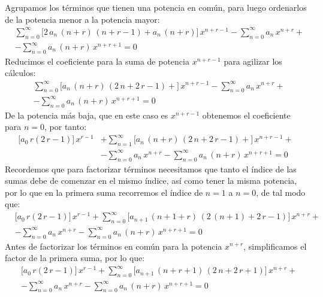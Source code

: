 Agrupamos los términos que tienen una potencia en común, para luego ordenarlos de la potencia menor a la potencia mayor:
\begin{align*}
&\sum_{n=0}^{\infty} \bigg[ 2 \, a_{n} \, (n + r) \, (n + r - 1) + a_{n} \, (n + r) \bigg] \, x^{n+r-1} -
\sum_{n=0}^{\infty} a_{n} \, x^{n+r} +  \\[0.5em]
&- \sum_{n=0}^{\infty} a_{n} \, (n + r) \, x^{n+r+1}  = 0
\end{align*}
Reducimos el coeficiente para la suma de potencia $x^{n+r-1}$ para agilizar los cálculos:
\begin{align*}
&\sum_{n=0}^{\infty} \bigg[ a_{n} \, (n + r) \, (2 \, n + 2 \, r - 1) + \bigg] \, x^{n+r-1} -
\sum_{n=0}^{\infty} a_{n} \, x^{n+r} +  \\[0.5em]
&- \sum_{n=0}^{\infty} a_{n} \, (n + r) \, x^{n+r+1}  = 0
\end{align*}
De la potencia más baja, que en este caso es $x^{n+r-1}$ obtenemos el coeficiente para $n=0$, por tanto:
\begin{align*}
\bigg[ a_{0} \, r (2 \, r - 1) \bigg] \, x^{r-1} &+ \sum_{n=1}^{\infty} \bigg[ a_{n} \, (n + r) \, (2 \, n + 2 \, r - 1) + \bigg] \, x^{n+r-1} + \\[0.5em]
&- \sum_{n=0}^{\infty} a_{n} \, x^{n+r} - \sum_{n=0}^{\infty} a_{n} \, (n + r) \, x^{n+r+1}  = 0
\end{align*}
Recordemos que para factorizar términos necesitamos que tanto el índice de las sumas debe de comenzar en el mismo índice, así como tener la misma potencia, por lo que en la primera suma recorremos el índice de $n = 1$ a $n = 0$, de tal modo que:
\begin{align*}
&\bigg[ a_{0} \, r (2 \, r - 1) \bigg] \, x^{r-1} + \sum_{n=0}^{\infty} \bigg[ a_{n+1} \, (n + 1 + r) \, (2 \, (n + 1) + 2 \, r - 1) \bigg] \, x^{n+r} + \\[0.5em]
&- \sum_{n=0}^{\infty} a_{n} \, x^{n+r} - \sum_{n=0}^{\infty} a_{n} \, (n + r) \, x^{n+r+1}  = 0
\end{align*}
Antes de factorizar los términos en común para la potencia $x^{n+r}$, simplificamos el factor de la primera suma, por lo que:
\begin{align*}
&\bigg[ a_{0} \, r (2 \, r - 1) \bigg] \, x^{r-1} + \sum_{n=0}^{\infty} \bigg[ a_{n+1} \, (n + r + 1) \, (2 \, n + 2 \, r + 1) \bigg] \, x^{n+r} + \\[0.5em]
&- \sum_{n=0}^{\infty} a_{n} \, x^{n+r} - \sum_{n=0}^{\infty} a_{n} \, (n + r) \, x^{n+r+1}  = 0
\end{align*}
